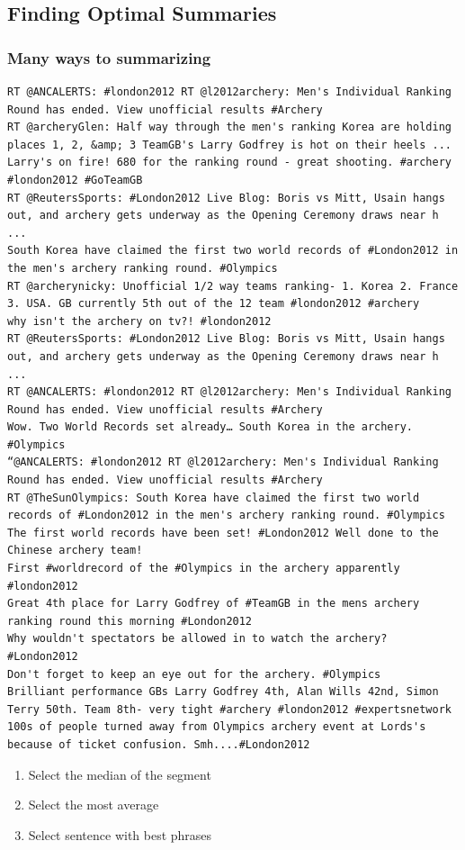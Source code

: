 \documentclass[compress]{beamer}
\begin{document}
\subsection{Finding Optimal Summaries}

\begin{frame}[fragile]
\frametitle{Many ways to summarizing}

{\fontsize{1}{0}\selectfont
\begin{verbatim}
RT @ANCALERTS: #london2012 RT @l2012archery: Men's Individual Ranking Round has ended. View unofficial results #Archery
RT @archeryGlen: Half way through the men's ranking Korea are holding places 1, 2, &amp; 3 TeamGB's Larry Godfrey is hot on their heels ...
Larry's on fire! 680 for the ranking round - great shooting. #archery #london2012 #GoTeamGB
RT @ReutersSports: #London2012 Live Blog: Boris vs Mitt, Usain hangs out, and archery gets underway as the Opening Ceremony draws near h ...
South Korea have claimed the first two world records of #London2012 in the men's archery ranking round. #Olympics
RT @archerynicky: Unofficial 1/2 way teams ranking- 1. Korea 2. France 3. USA. GB currently 5th out of the 12 team #london2012 #archery
why isn't the archery on tv?! #london2012
RT @ReutersSports: #London2012 Live Blog: Boris vs Mitt, Usain hangs out, and archery gets underway as the Opening Ceremony draws near h ...
RT @ANCALERTS: #london2012 RT @l2012archery: Men's Individual Ranking Round has ended. View unofficial results #Archery
Wow. Two World Records set already… South Korea in the archery. #Olympics
“@ANCALERTS: #london2012 RT @l2012archery: Men's Individual Ranking Round has ended. View unofficial results #Archery
RT @TheSunOlympics: South Korea have claimed the first two world records of #London2012 in the men's archery ranking round. #Olympics
The first world records have been set! #London2012 Well done to the Chinese archery team!
First #worldrecord of the #Olympics in the archery apparently #london2012
Great 4th place for Larry Godfrey of #TeamGB in the mens archery ranking round this morning #London2012
Why wouldn't spectators be allowed in to watch the archery? #London2012
Don't forget to keep an eye out for the archery. #Olympics
Brilliant performance GBs Larry Godfrey 4th, Alan Wills 42nd, Simon Terry 50th. Team 8th- very tight #archery #london2012 #expertsnetwork
100s of people turned away from Olympics archery event at Lords's because of ticket confusion. Smh....#London2012
\end{verbatim}
}

\pause

\begin{block}{}
    \begin{enumerate}[<+->]
        \item Select the median of the segment \cite{takamura11SummaryStream}
        \item Select the most average 
        \item Select sentence with best phrases \cite{nichols12SummarySports}
    \end{enumerate}
\end{block}

\end{frame}
\end{document}
